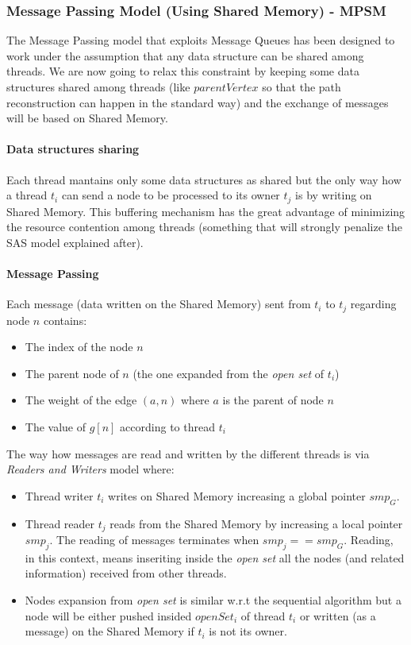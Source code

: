 \documentclass[twocolumn, switch]{article} %
\begin{document}
\subsubsection{Message Passing Model (Using Shared Memory) - MPSM}
The Message Passing model that exploits Message Queues has been designed to work under the assumption 
that any data structure can be shared among threads. We are now going to relax this constraint by 
keeping some data structures shared among threads (like $parentVertex$ so that
the path reconstruction can happen in the standard way) and the exchange of messages will be based on Shared Memory.
\paragraph{Data structures sharing}
Each thread mantains only some data structures as shared but the only way how
a thread $t_i$ can send a node to be processed to its owner $t_j$ is by writing on Shared Memory. This
buffering mechanism has the great advantage of minimizing the resource contention among threads (something that will strongly penalize the SAS model explained after).
\paragraph{Message Passing} 
Each message (data written on the Shared Memory) sent from $t_i$ to $t_j$ regarding node $n$ contains:
\begin{itemize}
  \item The index of the node $n$
  \item The parent node of $n$ (the one expanded from the \textit{open set} of $t_i$)
  \item The weight of the edge $(a, n)$ where $a$ is the parent of node $n$
  \item The value of $g[n]$ according to thread $t_i$
\end{itemize}
The way how messages are read and written by the different threads is via \textit{Readers and Writers}
model where:
\begin{itemize}
  \item Thread writer $t_i$ writes on Shared Memory increasing a global pointer $smp_G$.
  \item Thread reader $t_j$ reads from the Shared Memory by increasing a local pointer $smp_j$. The reading
        of messages terminates when $smp_j == smp_G$. Reading, in this context, means inseriting inside
        the \textit{open set} all the nodes (and related information) received from other threads.
  \item Nodes expansion from \textit{open set} is similar w.r.t the sequential algorithm but a node will
        be either pushed insided $openSet_i$ of thread $t_i$ or written (as a message) on the Shared Memory
        if $t_i$ is not its owner.
\end{itemize}
\end{document}
